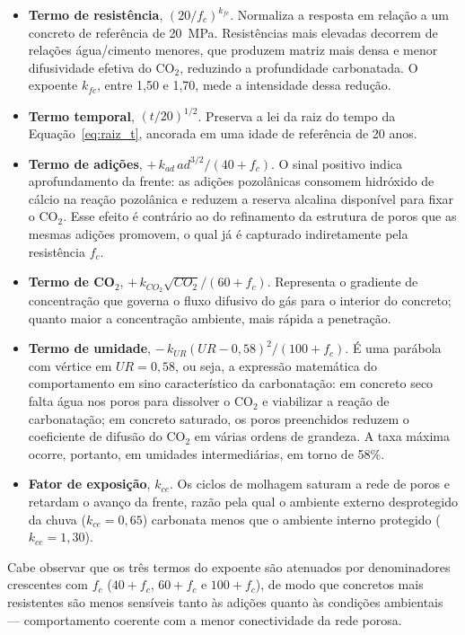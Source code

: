 \begin{itemize}[leftmargin=*]
    \item \textbf{Termo de resistência}, $(20/f_c)^{k_{fc}}$. Normaliza a resposta em relação a um concreto de referência de 20~MPa. Resistências mais elevadas decorrem de relações água/cimento menores, que produzem matriz mais densa e menor difusividade efetiva do CO$_2$, reduzindo a profundidade carbonatada. O expoente $k_{fc}$, entre 1,50 e 1,70, mede a intensidade dessa redução.

    \item \textbf{Termo temporal}, $(t/20)^{1/2}$. Preserva a lei da raiz do tempo da Equação~\eqref{eq:raiz_t}, ancorada em uma idade de referência de 20 anos.

    \item \textbf{Termo de adições}, $+\,k_{ad}\,ad^{3/2}/(40+f_c)$. O sinal positivo indica aprofundamento da frente: as adições pozolânicas consomem hidróxido de cálcio na reação pozolânica e reduzem a reserva alcalina disponível para fixar o CO$_2$. Esse efeito é contrário ao do refinamento da estrutura de poros que as mesmas adições promovem, o qual já é capturado indiretamente pela resistência $f_c$.

    \item \textbf{Termo de CO$_2$}, $+\,k_{CO_2}\sqrt{CO_2}/(60+f_c)$. Representa o gradiente de concentração que governa o fluxo difusivo do gás para o interior do concreto; quanto maior a concentração ambiente, mais rápida a penetração.

    \item \textbf{Termo de umidade}, $-\,k_{UR}(UR-0{,}58)^2/(100+f_c)$. É uma parábola com vértice em $UR = 0{,}58$, ou seja, a expressão matemática do comportamento em sino característico da carbonatação: em concreto seco falta água nos poros para dissolver o CO$_2$ e viabilizar a reação de carbonatação; em concreto saturado, os poros preenchidos reduzem o coeficiente de difusão do CO$_2$ em várias ordens de grandeza. A taxa máxima ocorre, portanto, em umidades intermediárias, em torno de 58\%.

    \item \textbf{Fator de exposição}, $k_{ce}$. Os ciclos de molhagem saturam a rede de poros e retardam o avanço da frente, razão pela qual o ambiente externo desprotegido da chuva ($k_{ce} = 0{,}65$) carbonata menos que o ambiente interno protegido ($k_{ce} = 1{,}30$).
\end{itemize}

Cabe observar que os três termos do expoente são atenuados por denominadores crescentes com $f_c$ ($40 + f_c$, $60 + f_c$ e $100 + f_c$), de modo que concretos mais resistentes são menos sensíveis tanto às adições quanto às condições ambientais --- comportamento coerente com a menor conectividade da rede porosa.

